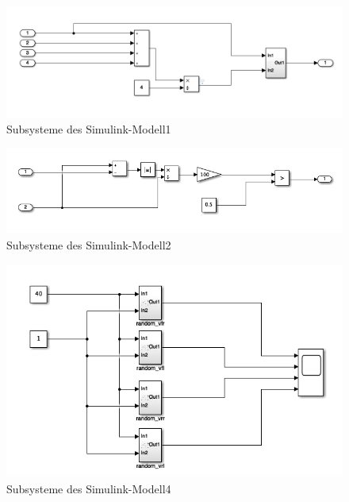 \begin{figure}
	\centering
	\includegraphics[width=1\linewidth]{../Graphiken/Simulink2}
	\caption{Subsysteme des Simulink-Modell1}
	\label{fig:Simulink2}
\end{figure}

\begin{figure}
	\centering
	\includegraphics[width=1\linewidth]{../Graphiken/Simulink3}
	\caption{Subsysteme des Simulink-Modell2}
	\label{fig:Simulink3}
\end{figure}

\begin{figure}
	\centering
	\includegraphics[width=1\linewidth]{../Graphiken/Simulink4}
	\caption{Subsysteme des Simulink-Modell4}
	\label{fig:Simulink4}
\end{figure}





	
	

	
	
	
	